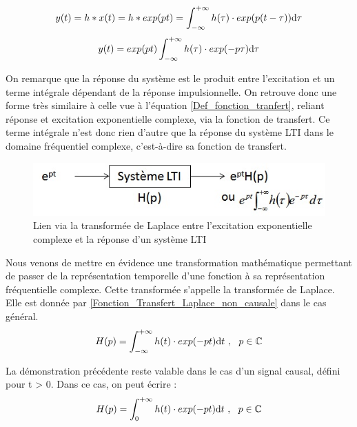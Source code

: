 \documentclass[]{book}
\begin{document}
{	\begin{equation}\label{}
	y(t) = h*x(t) = h * exp(pt) = \int_{-\infty}^{+\infty} h(\tau) \cdot exp(p(t-\tau))
 \mathrm{d} \tau 	
 	\end{equation}
	\begin{equation}\label{Demo_Laplace}
	y(t) = exp(pt) \int_{-\infty}^{+\infty} h(\tau) \cdot exp(-p\tau)
	\mathrm{d} \tau 	
	\end{equation}
	
	On remarque que la réponse du système est le produit entre l'excitation et un terme intégrale dépendant de la réponse impulsionnelle. On retrouve donc une forme très similaire à celle vue à l'équation \ref{Def_fonction_tranfert}, reliant réponse et excitation exponentielle complexe, via la fonction de transfert. Ce terme intégrale n'est donc rien d'autre que la réponse du système LTI dans le domaine fréquentiel complexe, c'est-à-dire sa fonction de transfert.
	\begin{figure}[h!]
		\centering
		\includegraphics[scale=0.7]{images/LTI_Laplace.jpg}
		\caption{Lien via la transformée de Laplace entre l'excitation exponentielle complexe et la réponse d'un système LTI}	
		\label{Fig:LTI_Laplace} 
	\end{figure}
	
	Nous venons de mettre en évidence une transformation mathématique permettant de passer de la représentation temporelle d'une fonction à sa représentation fréquentielle complexe. Cette transformée s'appelle la transformée de Laplace. Elle est donnée par \ref{Fonction_Transfert_Laplace_non_causale} dans le cas général.
	\begin{equation}\label{Fonction_Transfert_Laplace_non_causale}
	H(p) = \int_{-\infty}^{+\infty} h(t) \cdot exp(-pt)	\mathrm{d} t~,~~p \in \mathbb{C}	
	\end{equation}	
	
	La démonstration précédente reste valable dans le cas d'un signal causal, défini pour t > 0. Dans ce cas, on peut écrire :
	\begin{equation}\label{Fonction_Transfert_Laplace_causale}
	H(p) = \int_{0}^{+\infty} h(t) \cdot exp(-pt)	\mathrm{d} t~,~~p \in \mathbb{C}	
	\end{equation}
	
}
\end{document}
